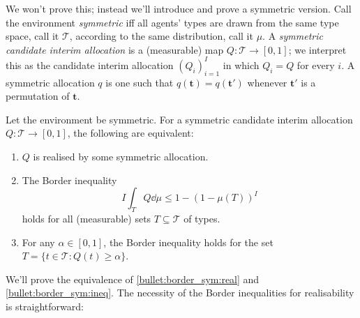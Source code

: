 We won't prove this; instead we'll introduce and prove a symmetric version.
Call the environment \emph{symmetric} iff all agents' types are drawn from the same type space, call it $\mathcal{T}$,
according to the same distribution, call it $\mu$.
A \emph{symmetric candidate interim allocation} is a (measurable) map $Q : \mathcal{T} \to [0,1]$;
we interpret this as the candidate interim allocation $(Q_i)_{i=1}^I$ in which $Q_i = Q$ for every $i$.
A symmetric allocation $q$ is one such that $q(\boldsymbol{t}) = q(\boldsymbol{t'})$ whenever $\boldsymbol{t'}$ is a permutation of $\boldsymbol{t}$.

\begin{namedthm}
	\label{theorem:border_sym}
	Let the environment be symmetric.
	For a symmetric candidate interim allocation $Q : \mathcal{T} \to [0,1]$,
	the following are equivalent:
	\begin{enumerate}
	
		\item \label{bullet:border_sym:real}
		$Q$ is realised by some symmetric allocation.

		\item \label{bullet:border_sym:ineq}
		The Border inequality
		\begin{equation*}
			I \int_T Q \dd \mu
			\leq 1 - \left( 1 - \mu(T) \right)^I
		\end{equation*}
		holds for all (measurable) sets $T \subseteq \mathcal{T}$ of types.

		\item \label{bullet:border_sym:alpha}
		For any $\alpha \in [0,1]$,
		the Border inequality holds for the set $T = \{ t \in \mathcal{T} : Q(t) \geq \alpha \}$.
	
	\end{enumerate}
\end{namedthm}

We'll prove the equivalence of \ref{bullet:border_sym:real} and \ref{bullet:border_sym:ineq}.
The necessity of the Border inequalities for realisability is straightforward:

